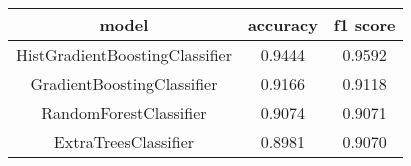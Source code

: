 \begin{tabular}{|c|c|c|}
\hline
model & accuracy & f1 score\\ 
 \hline 
HistGradientBoostingClassifier & 0.9444 & 0.9592\\ 
 \hline 
GradientBoostingClassifier & 0.9166 & 0.9118\\ 
 \hline 
RandomForestClassifier & 0.9074 & 0.9071\\ 
 \hline 
ExtraTreesClassifier & 0.8981 & 0.9070\\ 
 \hline 
\end{tabular}